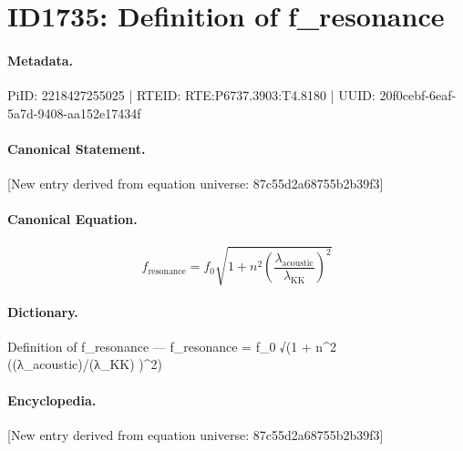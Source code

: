 \section*{ID1735: Definition of f\_resonance}
\paragraph{Metadata.}
PiID: 2218427255025 | RTEID: RTE:P6737.3903:T4.8180 | UUID: 20f0cebf-6eaf-5a7d-9408-aa152e17434f

\paragraph{Canonical Statement.}
[New entry derived from equation universe: 87c55d2a68755b2b39f3]

\paragraph{Canonical Equation.}
\[
\begin{equation} f_\text{resonance} = f_0 \sqrt{1 + n^2\left(\frac{\lambda_\text{acoustic}}{\lambda_\text{KK}}\right)^2} \end{equation}
\]

\paragraph{Dictionary.}
Definition of f\_resonance — f\_resonance = f\_0 √(1 + n\textasciicircum{}2 ((λ\_acoustic)/(λ\_KK) )\textasciicircum{}2)

\paragraph{Encyclopedia.}
[New entry derived from equation universe: 87c55d2a68755b2b39f3]
